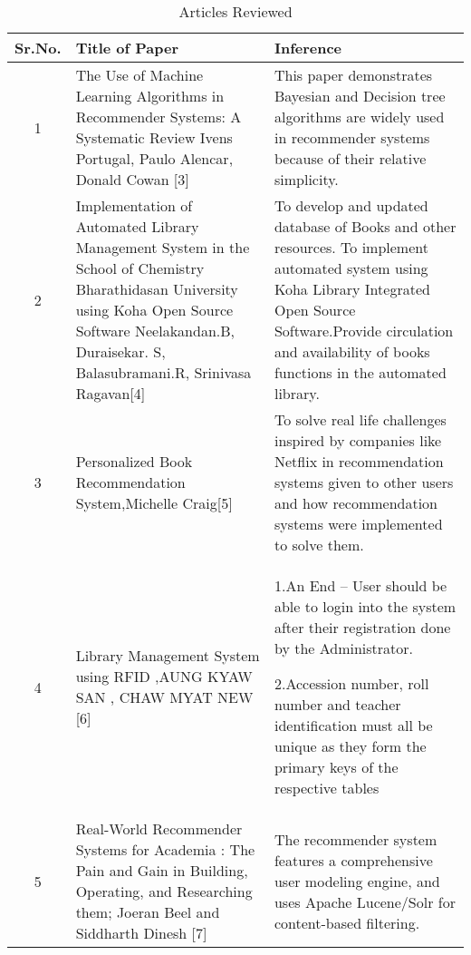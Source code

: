\documentclass[a4paper,12pt]{report}
\begin{document}
    \begin{table}[h!]
        \caption{Articles Reviewed}

        \begin{adjustbox}{max width=\textwidth}
        \begin{tabular}{|c|p{8cm}|p{8cm}|}
        \hline
        \textbf{Sr.No.} & \textbf{Title of Paper} & \textbf{Inference}\\
        \hline

        1 & The Use of Machine Learning Algorithms in Recommender Systems: A Systematic Review Ivens Portugal, Paulo Alencar, Donald Cowan [3]
        & This paper demonstrates Bayesian and Decision tree algorithms are widely used in recommender systems because of their relative simplicity.\\
        \hline

        2 & Implementation of Automated Library Management System in the School  of Chemistry Bharathidasan University using Koha Open Source Software Neelakandan.B, Duraisekar. S, Balasubramani.R, Srinivasa Ragavan[4]
        & To develop and updated database  of Books  and other resources. To implement automated system using Koha Library Integrated Open Source  Software.Provide circulation and availability of books functions in the automated library.\\
        \hline

        3 & Personalized Book Recommendation System,Michelle Craig[5]
        & To solve real life challenges inspired by companies like Netflix in recommendation systems given to other users and how recommendation systems were implemented to solve them.\\
        \hline

        4 & Library Management System using RFID ,AUNG KYAW SAN , CHAW MYAT NEW [6]
        & 1.An End – User should be able to login into the system after their registration done by the Administrator.

        2.Accession number, roll number and teacher identification must all be unique as they form the primary keys of the respective tables \\
        \hline

        5 & Real-World Recommender Systems for Academia : The Pain and Gain in Building, Operating, and Researching them; Joeran Beel and Siddharth Dinesh [7] & The recommender system features a comprehensive user modeling engine, and uses Apache Lucene/Solr for content-based filtering.\\
        \hline


\end{tabular}
\end{adjustbox}
\end{table}
\end{document}
